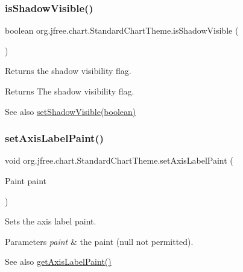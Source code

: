 \subsubsection{\texorpdfstring{is\+Shadow\+Visible()}{isShadowVisible()}}
{\footnotesize\ttfamily boolean org.\+jfree.\+chart.\+Standard\+Chart\+Theme.\+is\+Shadow\+Visible (\begin{DoxyParamCaption}{ }\end{DoxyParamCaption})}

Returns the shadow visibility flag.

\begin{DoxyReturn}{Returns}
The shadow visibility flag.
\end{DoxyReturn}
\begin{DoxySeeAlso}{See also}
\mbox{\hyperlink{classorg_1_1jfree_1_1chart_1_1_standard_chart_theme_a86c2f156c48f6891fac93f6241a6d8ff}{set\+Shadow\+Visible(boolean)}} 
\end{DoxySeeAlso}
\mbox{\label{classorg_1_1jfree_1_1chart_1_1_standard_chart_theme_a905484deb0fc0cac980df62d3265698b}} 
\subsubsection{\texorpdfstring{set\+Axis\+Label\+Paint()}{setAxisLabelPaint()}}
{\footnotesize\ttfamily void org.\+jfree.\+chart.\+Standard\+Chart\+Theme.\+set\+Axis\+Label\+Paint (\begin{DoxyParamCaption}\item[{Paint}]{paint }\end{DoxyParamCaption})}

Sets the axis label paint.


\begin{DoxyParams}{Parameters}
{\em paint} & the paint ({\ttfamily null} not permitted).\\
\hline
\end{DoxyParams}
\begin{DoxySeeAlso}{See also}
\mbox{\hyperlink{classorg_1_1jfree_1_1chart_1_1_standard_chart_theme_a1aa86cdb01a8291e444a919d1419f40e}{get\+Axis\+Label\+Paint()}} 
\end{DoxySeeAlso}
\mbox{\label{classorg_1_1jfree_1_1chart_1_1_standard_chart_theme_a763e33e247502dfb414be9d1052b8f00}} 
